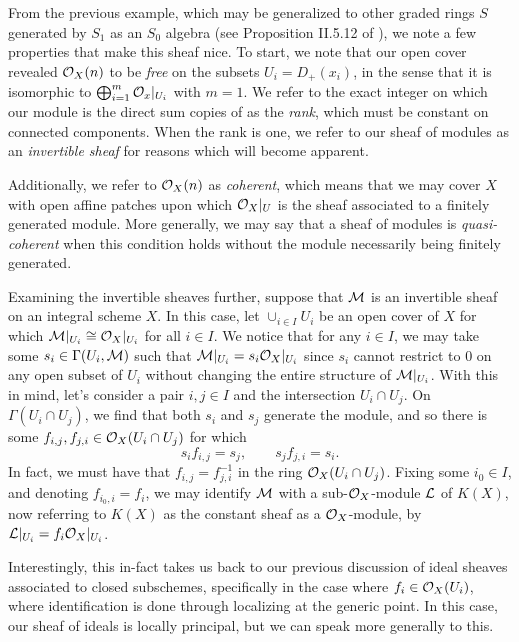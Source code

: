From the previous example, 
which may be generalized to other graded rings $S$ generated by $S_1$ as an $S_0$ algebra (see Proposition II.5.12 of \cite{Hartshorne_2013}),
we note a few properties that make this sheaf nice.
To start, we note that our open cover revealed $\mathcal{O}_X(n)$ to be \textit{free} on the subsets $U_i = D_+(x_i)$,
in the sense that it is isomorphic to $\bigoplus_{i = 1}^m \mathcal{O}_x|_{U_i}$ with $m = 1$.
We refer to the exact integer on which our module is the direct sum copies of as the \textit{rank},
which must be constant on connected components.
When the rank is one,
we refer to our sheaf of modules as an \textit{invertible sheaf} for reasons which will become apparent.

Additionally, we refer to $\mathcal{O}_X(n)$ as \textit{coherent},
which means that we may cover $X$ with open affine patches upon which $\mathcal{O}_X|_U$ is the sheaf associated to a finitely generated module.
More generally, we may say that a sheaf of modules is \textit{quasi-coherent} when this condition holds without the module necessarily being finitely generated.

Examining the invertible sheaves further,
suppose that $\mathcal{M}$ is an invertible sheaf on an integral scheme $X$.
In this case, let $\cup_{i \in I} U_i$ be an open cover of $X$ for which $\mathcal{M}|_{U_i} \cong \mathcal{O}_X|_{U_i}$ for all $i \in I$.
We notice that for any $i \in I$,
we may take some $s_i \in \Gamma(U_i, \mathcal{M})$ such that $\mathcal{M}|_{U_i} = s_i \mathcal{O}_X|_{U_i}$ since $s_i$ cannot restrict to $0$  on any open subset of $U_i$ without changing the entire structure of $\mathcal{M}|_{U_i}$.
With this in mind, let's consider a pair $i, j \in I$ and the intersection $U_i \cap U_j$.
On $\Gamma(U_i \cap U_j)$, we find that both $s_i$ and $s_j$ generate the module,
and so there is some $f_{i,j}, f_{j, i} \in \mathcal{O}_X(U_i \cap U_j)$ for which
\[
    s_i f_{i, j} = s_j, \qquad
    s_j f_{j, i} = s_i.
\]
In fact, we must have that $f_{i, j} = f_{j, i}^{-1}$ in the ring $\mathcal{O}_X(U_i \cap U_j)$.
Fixing some $i_0 \in I$, and denoting $f_{i_0, i} = f_i$,
we may identify $\mathcal{M}$ with a sub-$\mathcal{O}_X$-module $\mathcal{L}$ of $K(X)$,
now referring to $K(X)$ as the constant sheaf as a $\mathcal{O}_X$-module,
by $\mathcal{L}|_{U_i} = f_i \mathcal{O}_X|_{U_i}$.

Interestingly, this in-fact takes us back to our previous discussion of ideal sheaves associated to closed subschemes,
specifically in the case where $f_i \in \mathcal{O}_X(U_i)$,
where identification is done through localizing at the generic point.
In this case, our sheaf of ideals is locally principal, but we can speak more generally to this.

